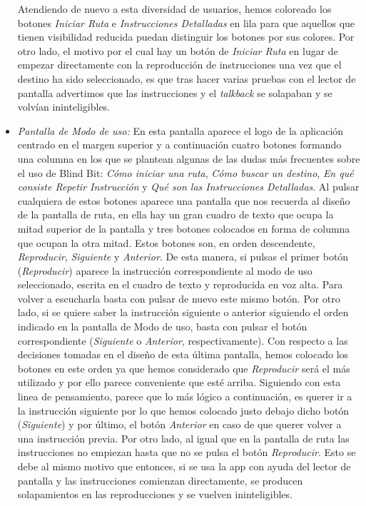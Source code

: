 \begin{itemize}
	Atendiendo de nuevo a esta diversidad de usuarios, hemos coloreado los botones \textit{Iniciar Ruta} e \textit{Instrucciones Detalladas} en lila para que aquellos que tienen visibilidad reducida puedan distinguir los botones por sus colores. Por otro lado, el motivo por el cual hay un botón de \textit{Iniciar Ruta} en lugar de empezar directamente con la reproducción de instrucciones una vez que el destino ha sido seleccionado, es que tras hacer varias pruebas con el lector de pantalla advertimos que las instrucciones y el \textit{talkback} se solapaban y se volvían ininteligibles.
	
	\item \textit{Pantalla de Modo de uso:} En esta pantalla aparece el logo de la aplicación centrado en el margen superior y a continuación cuatro botones formando una columna en los que se plantean algunas de las dudas más frecuentes sobre el uso de Blind Bit: \textit{Cómo iniciar una ruta}, \textit{Cómo buscar un destino}, \textit{En qué consiste Repetir Instrucción} y \textit{Qué son las Instrucciones Detalladas}. Al pulsar cualquiera de estos botones aparece una pantalla que nos recuerda al diseño de la pantalla de ruta, en ella hay un gran cuadro de texto que ocupa la mitad superior de la pantalla y tres botones colocados en forma de columna que ocupan la otra mitad. Estos botones son, en orden descendente, \textit{Reproducir}, \textit{Siguiente} y \textit{Anterior}. De esta manera, si pulsas el primer botón (\textit{Reproducir}) aparece la instrucción correspondiente al modo de uso seleccionado, escrita en el cuadro de texto y reproducida en voz alta. Para volver a escucharla basta con pulsar de nuevo este mismo botón. Por otro lado, si se quiere saber la instrucción siguiente o anterior siguiendo el orden indicado en la pantalla de Modo de uso, basta con pulsar el botón correspondiente (\textit{Siguiente} o \textit{Anterior}, respectivamente). Con respecto a las decisiones tomadas en el diseño de esta última pantalla, hemos colocado los botones en este orden ya que hemos considerado que \textit{Reproducir} será el más utilizado y por ello parece conveniente que esté arriba. Siguiendo con esta linea de pensamiento, parece que lo más lógico a continuación, es querer ir a la instrucción siguiente por lo que hemos colocado justo debajo dicho botón (\textit{Siguiente}) y por último, el botón \textit{Anterior} en caso de que querer volver a una instrucción previa. Por otro lado, al igual que en la pantalla de ruta las instrucciones no empiezan hasta que no se pulsa el botón \textit{Reproducir}. Esto se debe al mismo motivo que entonces, si se usa la app con ayuda del lector de pantalla y las instrucciones comienzan directamente, se producen solapamientos en las reproducciones y se vuelven ininteligibles.
\end{itemize}



